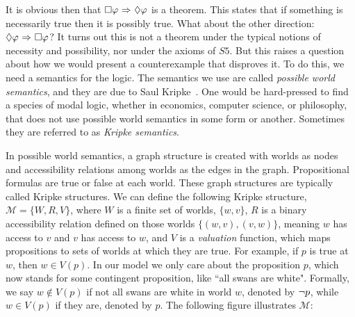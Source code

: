
It is obvious then that $\Box \varphi {\ \Rightarrow \ } \Diamond \varphi$ is a theorem. This states that if something is necessarily true then it is possibly true. What about the other direction: $\Diamond \varphi {\ \Rightarrow \ } \Box \varphi$? It turns out this is not a theorem under the typical notions of necessity and possibility, nor under the axioms of $\mathit{S5}$. But this raises a question about how we would present a counterexample that disproves it. To do this, we need a semantics for the logic. The semantics we use are called \emph{possible world semantics}, and they are due to Saul Kripke~\cite{Kripke}. One would be hard-pressed to find a species of modal logic, whether in economics, computer science, or philosophy, that does not use possible world semantics in some form or another. Sometimes they are referred to as \emph{Kripke semantics}.

In possible world semantics, a graph structure is created with worlds as nodes and accessibility relations among worlds as the edges in the graph. Propositional formulas are true or false at each world. These graph structures are typically called Kripke structures. We can define the following Kripke structure, $\mathcal{M} = \{W, R, V\}$, where $W$ is a finite set of worlds, $\{w, v\}$, $R$ is a binary accessibility relation defined on those worlds $\{(w,v), (v,w)\}$, meaning $w$ has access to $v$ and $v$ has access to $w$, and $V$ is a \emph{valuation} function, which maps propositions to sets of worlds at which they are true. For example, if $p$ is true at $w$, then $w \in V(p)$. In our model we only care about the proposition $p$, which now stands for some contingent proposition, like ``all swans are white". Formally, we say $w \not\in V(p)$ if not all swans are white in world $w$, denoted by ${\neg} p$, while $w \in V(p)$ if they are, denoted by $p$. The following figure illustrates $\mathcal{M}$:

